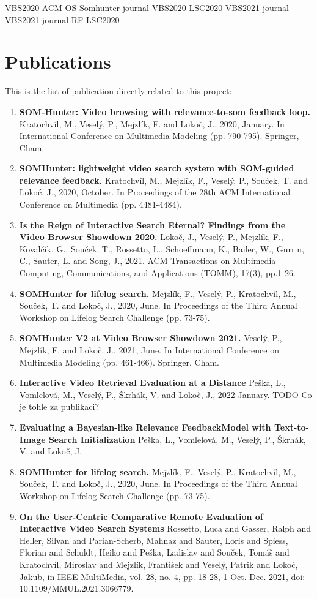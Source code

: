 VBS2020\cite{kratochvil2020som}
ACM OS Somhunter \cite{kratochvil2020somhunter}
journal VBS2020\cite{lokovc2021reign}
LSC2020\cite{mejzlik2020somhunter}
VBS2021\cite{vesely2021somhunter}
journal VBS2021\cite{journalvbs2021}
journal RF \cite{journalRF}
LSC2020\cite{lokovc2021enhanced}


\section{Publications}
This is the list of publication directly related to this project:
\begin{enumerate}
	\item \textbf{SOM-Hunter: Video browsing with relevance-to-som feedback loop.} Kratochvíl, M., Veselý, P., Mejzlík, F. and Lokoč, J., 2020, January. In International Conference on Multimedia Modeling (pp. 790-795). Springer, Cham.
	\item \textbf{SOMHunter: lightweight video search system with SOM-guided relevance feedback.} Kratochvíl, M., Mejzlík, F., Veselý, P., Soućek, T. and Lokoć, J., 2020, October. In Proceedings of the 28th ACM International Conference on Multimedia (pp. 4481-4484).
	\item \textbf{Is the Reign of Interactive Search Eternal? Findings from the Video Browser Showdown 2020.} Lokoč, J., Veselý, P., Mejzlík, F., Kovalčík, G., Souček, T., Rossetto, L., Schoeffmann, K., Bailer, W., Gurrin, C., Sauter, L. and Song, J., 2021.  ACM Transactions on Multimedia Computing, Communications, and Applications (TOMM), 17(3), pp.1-26.
	\item \textbf{SOMHunter for lifelog search.} Mejzlík, F., Veselý, P., Kratochvíl, M., Souček, T. and Lokoč, J., 2020, June. In Proceedings of the Third Annual Workshop on Lifelog Search Challenge (pp. 73-75).
	\item \textbf{SOMHunter V2 at Video Browser Showdown 2021.} Veselý, P., Mejzlík, F. and Lokoč, J., 2021, June. In International Conference on Multimedia Modeling (pp. 461-466). Springer, Cham.
	\item \textbf{Interactive Video Retrieval Evaluation at a Distance} Peška, L., Vomlelová, M., Veselý, P., Škrhák, V. and Lokoč, J., 2022 January. {\color{red} TODO Co je tohle za publikaci?	}
	\item \textbf{Evaluating a Bayesian-like Relevance FeedbackModel with Text-to-Image Search Initialization} Peška, L., Vomlelová, M., Veselý, P., Škrhák, V. and Lokoč, J.
	\item \textbf{SOMHunter for lifelog search.} Mejzlík, F., Veselý, P., Kratochvíl, M., Souček, T. and Lokoč, J., 2020, June. In Proceedings of the Third Annual Workshop on Lifelog Search Challenge (pp. 73-75).
	\item \textbf{On the User-Centric Comparative Remote Evaluation of Interactive Video Search Systems} Rossetto, Luca and Gasser, Ralph and Heller, Silvan and Parian-Scherb, Mahnaz and Sauter, Loris and Spiess, Florian and Schuldt, Heiko and Peška, Ladislav and Souček, Tomáš and Kratochvíl, Miroslav and Mejzlík, František and Veselý, Patrik and Lokoč, Jakub, in IEEE MultiMedia, vol. 28, no. 4, pp. 18-28, 1 Oct.-Dec. 2021, doi: 10.1109/MMUL.2021.3066779.
\end{enumerate}
